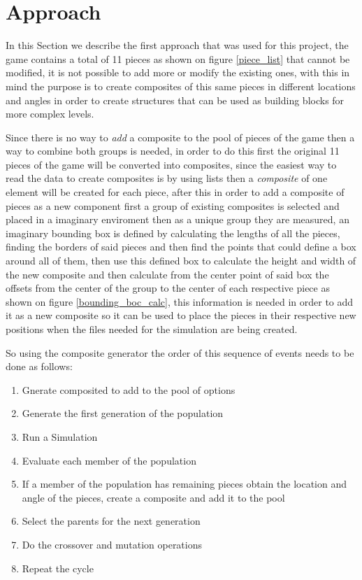 \documentclass[conference]{IEEEtran}
\begin{document}
\section{Approach}

In this Section we describe the first approach that was used for this project, the
game contains a total of 11 pieces as shown on figure \ref{piece_list} that
cannot be modified, it is not possible to add more or modify the existing ones,
with this in mind the purpose is to create composites of this same pieces in
different locations and angles in order to create structures that can be used as
building blocks for more complex levels. 

Since there is no way to \textit{add} a composite to the pool of pieces of the 
game then a way to combine both groups is needed, in order to do this first the 
original 11 pieces of the game will be converted into composites, since the easiest
way to read the data to create composites is by using lists then a \textit{composite} 
of one element will be created for each piece, after this in order to add a 
composite of pieces as a new component first a group of existing composites is 
selected and placed in a imaginary enviroment then as a unique group they are 
measured, an imaginary bounding box is defined by calculating the lengths of all
the pieces, finding the borders of said pieces and then find the points that could
define a box around all of them, then use this defined box to calculate the 
height and width of the new composite and then calculate from 
the center point of said box the offsets from the center of the
group to the center of each respective piece as shown on figure
\ref{bounding_boc_calc}, this information is needed in order to add it as a new
composite so it can be used to place the pieces in their respective new positions
when the files needed for the simulation are being created.

So using the composite generator the order of this sequence of
events needs to be done as follows:




\begin{enumerate}
\item Gnerate composited to add to the pool of options
\item Generate the first generation of the population
\item Run a Simulation
\item Evaluate each member of the population
\item If a member of the population has remaining pieces obtain the location and
angle of the pieces, create a composite and add it to the pool
\item Select the parents for the next generation
\item Do the crossover and mutation operations
\item Repeat the cycle
\end{enumerate}
\end{document}
